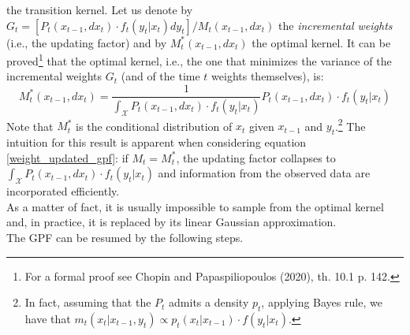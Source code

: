 \documentclass[
]{book}
\theoremstyle{break}
\theoremstyle{nonumberplain}
\begin{document}
the transition kernel. Let us denote by
\(G_t=[P_t(x_{t-1},dx_t)\cdot f_t(y_t|x_t)dy_t]/M_t(x_{t-1},dx_t)\) the
\textit{incremental weights} (i.e., the updating factor) and by
\(M_t^*(x_{t-1},dx_t)\) the optimal kernel. It can be
proved\footnote{For a formal proof see Chopin and Papaspiliopoulos (2020), th. 10.1 p. 142.}
that the optimal kernel, i.e., the one that minimizes the variance of
the incremental weights \(G_t\) (and of the time \(t\) weights
themselves), is: \begin{equation}
    M_t^*(x_{t-1},dx_t)=\frac{1}{\int_{\mathcal X}P_t(x_{t-1},dx_t)\cdot f_t(y_t|x_t)} P_t(x_{t-1},dx_t)\cdot f_t(y_t|x_t)
\end{equation} Note that \(M_t^*\) is the conditional distribution of
\(x_t\) given \(x_{t-1}\) and
\(y_t\).\footnote{In fact, assuming that the $P_t$ admits a density $p_t$, applying Bayes rule, we have that $m_t(x_t|x_{t-1},y_t)\propto p_t(x_t|x_{t-1})\cdot f(y_t|x_t)$.}
The intuition for this result is apparent when considering equation
\eqref{weight_updated_gpf}: if \(M_t=M_t^*\), the updating factor
collapses to \(\int_{\mathcal X}P_t(x_{t-1},dx_t)\cdot f_t(y_t|x_t)\)
and information from the observed data are incorporated efficiently.\\
As a matter of fact, it is usually impossible to sample from the optimal
kernel and, in practice, it is replaced by its linear Gaussian
approximation. ~\\
The GPF can be resumed by the following steps.
\end{document}
